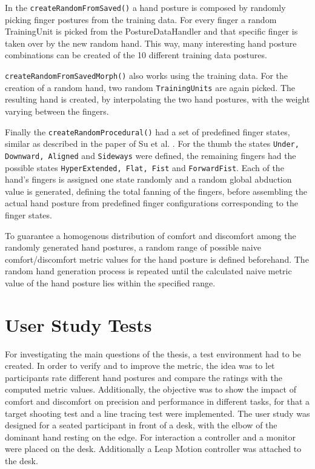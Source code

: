 In the \texttt{createRandomFromSaved()} a hand posture is composed by randomly picking finger postures from the training data. For every finger a random TrainingUnit is picked from the PostureDataHandler and that specific finger is taken over by the new random hand. This way, many interesting hand posture combinations can be created of the 10 different training data postures.

\texttt{createRandomFromSavedMorph()} also works using the training data. For the creation of a random hand, two random \texttt{TrainingUnits} are again picked. The resulting hand is created, by interpolating the two hand postures, with the weight varying between the fingers. 

Finally the \texttt{createRandomProcedural()} had a set of predefined finger states, similar as described in the paper of Su et al. \cite{su1994logical}. For the thumb the states \texttt{Under, Downward, Aligned} and \texttt{Sideways} were defined, the remaining fingers had the possible states \texttt{HyperExtended, Flat, Fist} and \texttt{ForwardFist}. Each of the hand's fingers is assigned one state randomly and a random global abduction value is generated, defining the total fanning of the fingers, before assembling the actual hand posture from predefined finger configurations corresponding to the finger states.

To guarantee a homogenous distribution of comfort and discomfort among the randomly generated hand postures, a random range of possible naive comfort/discomfort metric values for the hand posture is defined beforehand. The random hand generation process is repeated until the calculated naive metric value of the hand posture lies within the specified range.

\section{User Study Tests}

For investigating the main questions of the thesis, a test environment had to be created. In order to verify and to improve the metric, the idea was to let participants rate different hand postures and compare the ratings with the computed metric values. Additionally, the objective was to show the impact of comfort and discomfort on precision and performance in different tasks, for that a target shooting test and a line tracing test were implemented.
The user study was designed for a seated participant in front of a desk, with the elbow of the dominant hand resting on the edge. For interaction a controller and a monitor were placed on the desk. Additionally a Leap Motion controller was attached to the desk.  

